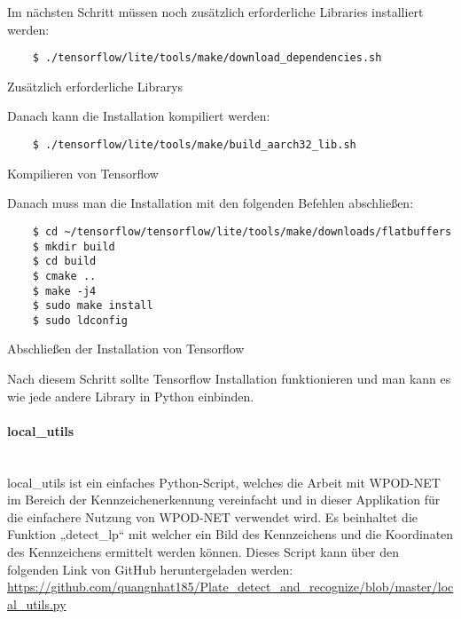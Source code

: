 Im nächsten Schritt müssen noch zusätzlich erforderliche Libraries installiert werden:

\begin{listing}[H]
    \begin{verbatim}
    $ ./tensorflow/lite/tools/make/download_dependencies.sh
    \end{verbatim}
    \caption{Zusätzlich erforderliche Librarys}
\end{listing}

Danach kann die Installation kompiliert werden:

\begin{listing}[H]
    \begin{verbatim}
    $ ./tensorflow/lite/tools/make/build_aarch32_lib.sh
    \end{verbatim}
    \caption{Kompilieren von Tensorflow}
\end{listing}

Danach muss man die Installation mit den folgenden Befehlen abschließen:

\begin{listing}[H]
    \begin{verbatim}
    $ cd ~/tensorflow/tensorflow/lite/tools/make/downloads/flatbuffers
    $ mkdir build
    $ cd build
    $ cmake ..
    $ make -j4
    $ sudo make install
    $ sudo ldconfig
    \end{verbatim}
    \caption{Abschließen der Installation von Tensorflow}
\end{listing}

Nach diesem Schritt sollte Tensorflow Installation funktionieren und man kann es wie jede andere Library in Python einbinden.

\paragraph{local{\_}utils}\mbox{}\\
local{\_}utils ist ein einfaches Python-Script, welches die Arbeit mit WPOD-NET im Bereich der Kennzeichenerkennung vereinfacht 
und in dieser Applikation für die einfachere Nutzung von WPOD-NET verwendet wird. Es beinhaltet die Funktion „detect{\_}lp“ mit 
welcher ein Bild des Kennzeichens und die Koordinaten des Kennzeichens ermittelt werden können. Dieses Script kann über den 
folgenden Link von GitHub heruntergeladen werden: \url{https://github.com/quangnhat185/Plate_detect_and_recognize/blob/master/local_utils.py} 

